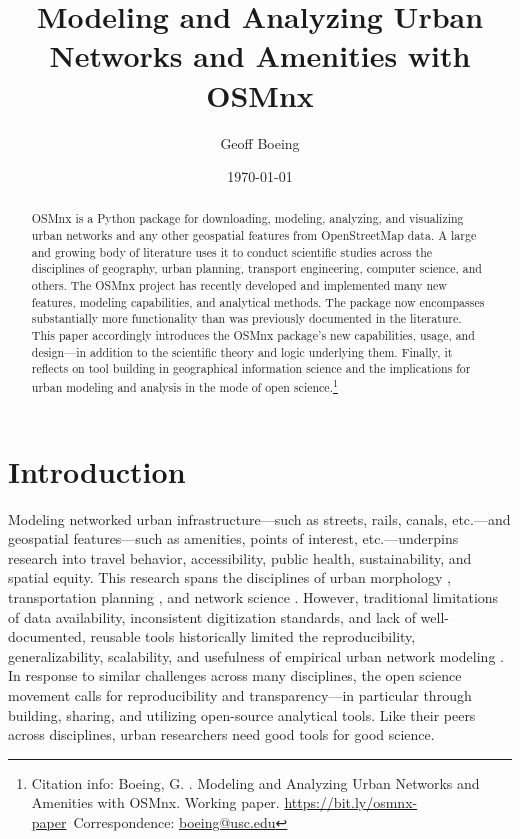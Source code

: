 \documentclass[12pt,letterpaper]{article} %
\makeatletter
\newcommand{\myname}{Geoff Boeing}
\newcommand{\myemail}{boeing@usc.edu}
\newcommand{\myaffiliation}{University of Southern California}
\newcommand{\paperdate}{\monthyeardate\today}
\newcommand{\papertitle}{Modeling and Analyzing Urban Networks and Amenities with OSMnx}
\newcommand{\papercitation}{Boeing, G. \the\year. \papertitle. Working paper. \href{https://bit.ly/osmnx-paper}{https://bit.ly/osmnx-paper}}
\makeatother
\begin{document}
\title{\papertitle}
\author[]{\myname}
\affil[]{\myaffiliation}
\date{\paperdate}

\maketitle

\begin{abstract}

OSMnx is a Python package for downloading, modeling, analyzing, and visualizing urban networks and any other geospatial features from OpenStreetMap data. A large and growing body of literature uses it to conduct scientific studies across the disciplines of geography, urban planning, transport engineering, computer science, and others. The OSMnx project has recently developed and implemented many new features, modeling capabilities, and analytical methods. The package now encompasses substantially more functionality than was previously documented in the literature. This paper accordingly introduces the OSMnx package's new capabilities, usage, and design---in addition to the scientific theory and logic underlying them. Finally, it reflects on tool building in geographical information science and the implications for urban modeling and analysis in the mode of open science.\footnote{Citation info: \papercitation~Correspondence: \href{mailto:\myemail}{\myemail}}

\end{abstract}

\section{Introduction}

Modeling networked urban infrastructure---such as streets, rails, canals, etc.---and geospatial features---such as amenities, points of interest, etc.---underpins research into travel behavior, accessibility, public health, sustainability, and spatial equity. This research spans the disciplines of urban morphology \citep[e.g.,][]{gervasoni_calculating_2017,dacci_signature_2019,coutrot_cities_2020}, transportation planning \citep[e.g.,][]{merchan_quantifying_2020,liao_disparities_2020,natera_orozco_data-driven_2019}, and network science \citep[e.g.,][]{feng_spatial_2020,yin_multi-task_2020,young_automatic_2020}. However, traditional limitations of data availability, inconsistent digitization standards, and lack of well-documented, reusable tools historically limited the reproducibility, generalizability, scalability, and usefulness of empirical urban network modeling \citep{liu_generalized_2021}. In response to similar challenges across many disciplines, the open science movement calls for reproducibility and transparency---in particular through building, sharing, and utilizing open-source analytical tools. Like their peers across disciplines, urban researchers need good tools for good science.
\end{document}
